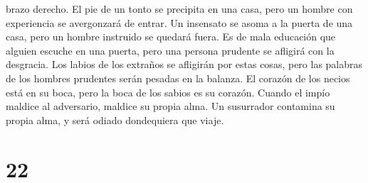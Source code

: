 brazo derecho.  El pie de un tonto se precipita en una
casa, pero un hombre con experiencia se avergonzará de entrar.
 Un insensato se asoma a la puerta de una casa, pero un
hombre instruido se quedará fuera.  Es de mala educación
que alguien escuche en una puerta, pero una persona prudente se afligirá
con la desgracia.  Los labios de los extraños se
afligirán por estas cosas, pero las palabras de los hombres prudentes
serán pesadas en la balanza.  El corazón de los necios
está en su boca, pero la boca de los sabios es su corazón.
 Cuando el impío maldice al adversario, maldice su propia
alma.  Un susurrador contamina su propia alma, y será
odiado dondequiera que viaje.

\hypertarget{section-21}{%
\section{22}\label{section-21}}

